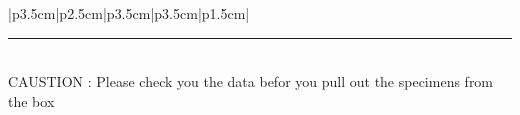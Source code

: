 \documentclass{article}
\newcommand*{\Data}[1]{%
  
    #1\\ 
    \hline
}%
\begin{document}
\fancyheadoffset{0pt}%

\begin{MyTabularX}{|p{3.5cm}|p{2.5cm}|p{3.5cm}|p{3.5cm}|p{1.5cm}|}



\end{MyTabularX}

\textcolor{black}{\rule{17cm}{1mm}} \\
CAUSTION : Please check you the data befor you pull out the specimens from the box
  
\end{document}
